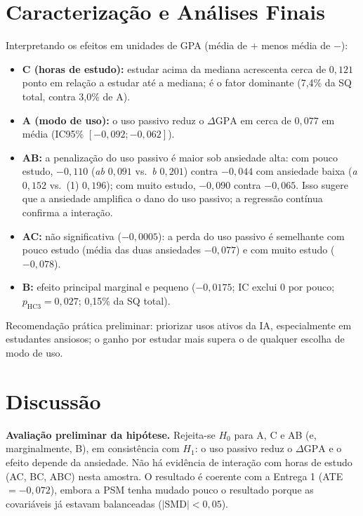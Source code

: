 \documentclass[12pt,a4paper]{article}
\newcommand{\dgpa}{\ensuremath{\Delta\mathrm{GPA}}}
\begin{document}
\section{Caracteriza\c{c}\~ao e An\'alises Finais}
Interpretando os efeitos em unidades de GPA (m\'edia de $+$ menos m\'edia de $-$):
\begin{itemize}
\item \textbf{C (horas de estudo):} estudar acima da mediana acrescenta cerca de $0{,}121$ ponto em rela\c{c}\~ao a estudar at\'e a mediana; \'e o fator dominante (7,4\% da SQ total, contra 3,0\% de A).
\item \textbf{A (modo de uso):} o uso passivo reduz o \dgpa{} em cerca de $0{,}077$ em m\'edia (IC95\% $[-0{,}092;-0{,}062]$).
\item \textbf{AB:} a penaliza\c{c}\~ao do uso passivo \'e maior sob ansiedade alta: com pouco estudo, $-0{,}110$ (\emph{ab} $0{,}091$ vs.\ \emph{b} $0{,}201$) contra $-0{,}044$ com ansiedade baixa (\emph{a} $0{,}152$ vs.\ (1) $0{,}196$); com muito estudo, $-0{,}090$ contra $-0{,}065$. Isso sugere que a ansiedade amplifica o dano do uso passivo; a regress\~ao cont\'inua confirma a intera\c{c}\~ao.
\item \textbf{AC:} n\~ao significativa ($-0{,}0005$): a perda do uso passivo \'e semelhante com pouco estudo (m\'edia das duas ansiedades $-0{,}077$) e com muito estudo ($-0{,}078$).
\item \textbf{B:} efeito principal marginal e pequeno ($-0{,}0175$; IC exclui 0 por pouco; $p_{\text{HC3}}=0{,}027$; 0,15\% da SQ total).
\end{itemize}
Recomenda\c{c}\~ao pr\'atica preliminar: priorizar usos ativos da IA, especialmente em estudantes ansiosos; o ganho por estudar mais supera o de qualquer escolha de modo de uso.

\section{Discuss\~ao}
\textbf{Avalia\c{c}\~ao preliminar da hip\'otese.} Rejeita-se $H_0$ para A, C e AB (e, marginalmente, B), em consist\^encia com $H_1$: o uso passivo
reduz o \dgpa{} e o efeito depende da ansiedade. N\~ao h\'a evid\^encia de intera\c{c}\~ao com horas de estudo (AC, BC, ABC) nesta amostra.
O resultado \'e coerente com a Entrega 1 (ATE $=-0{,}072$), embora a PSM tenha mudado pouco o resultado porque as covari\'aveis j\'a estavam balanceadas ($|\text{SMD}|<0{,}05$).
\end{document}
